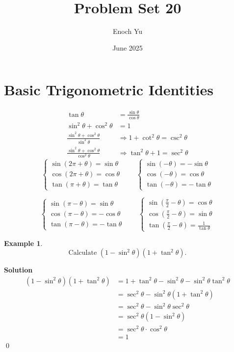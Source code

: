 \documentclass{article}
\title{Problem Set 20}
\author{Enoch Yu}
\date{June 2025}
\newtheorem*{example*}{Example}
\newenvironment{solution}{\begin{trivlist}\item[]{\bf Solution}}{\qed \end{trivlist}}
\begin{document}
\section*{Basic Trigonometric Identities}
\begin{align*}
    \tan\theta &= \frac{\sin\theta}{\cos\theta} \\
    \sin^2\theta + \cos^2\theta &= 1 \\
    \frac{\sin^2\theta + \cos^2\theta}{\sin^2\theta} &\Rightarrow 1 + \cot^2\theta = \csc^2\theta \\
    \frac{\sin^2\theta + \cos^2\theta}{\cos^2\theta} &\Rightarrow \tan^2\theta + 1 = \sec^2\theta
\end{align*}
\[
\left\{
\begin{array}{l}
\sin(2\pi + \theta) = \sin\theta \\
\cos(2\pi + \theta) = \cos\theta \\
\tan(\pi + \theta) = \tan\theta
\end{array}
\right.
\qquad
\left\{
\begin{array}{l}
\sin(-\theta) = -\sin\theta \\
\cos(-\theta) = \cos\theta \\
\tan(-\theta) = -\tan\theta
\end{array}
\right.
\]

\[
\left\{
\begin{array}{l}
\sin(\pi - \theta) = \sin\theta \\
\cos(\pi - \theta) = -\cos\theta \\
\tan(\pi - \theta) = -\tan\theta
\end{array}
\right.
\qquad
\left\{
\begin{array}{l}
\sin\left(\frac{\pi}{2} - \theta\right) = \cos\theta \\
\cos\left(\frac{\pi}{2} - \theta\right) = \sin\theta \\
\tan\left(\frac{\pi}{2} - \theta\right) = \frac{1}{\tan\theta}
\end{array}
\right.
\]

\begin{example*}
    \[
    \text{Calculate }(1-\sin^2\theta)(1+\tan^2\theta).
    \]
\end{example*}
\begin{solution}
    \begin{align*}
        (1-\sin^2\theta)(1+\tan^2\theta)
        &= 1 + \tan^2\theta - \sin^2\theta - \sin^2\theta\tan^2\theta \\
        &= \sec^2\theta - \sin^2\theta(1 + \tan^2\theta) \\
        &= \sec^2\theta - \sin^2\theta\sec^2\theta \\
        &= \sec^2\theta(1 - \sin^2\theta) \\
        &= \sec^2\theta \cdot \cos^2\theta \\
        &= \boxed{1}
    \end{align*}
\end{solution}
\end{document}

